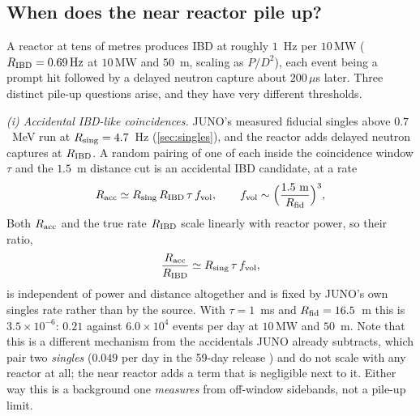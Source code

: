 \documentclass[aps,prd,superscriptaddress,nofootinbib,longbibliography,notitlepage,11pt]{revtex4-2}
\begin{document}
\subsection{When does the near reactor pile up?}
\label{sec:pileup}
A reactor at tens of metres produces IBD at roughly $1$~Hz per $10\,\mathrm{MW}$
($R_{\rm IBD}=0.69\,\mathrm{Hz}$ at $10\,\mathrm{MW}$ and $50$~m, scaling as $P/D^2$), each
event being a prompt hit followed by a delayed neutron capture about $200\,\mu$s later.
Three distinct pile-up questions arise, and they have very different thresholds.

\emph{(i) Accidental IBD-like coincidences.}  JUNO's measured fiducial singles above
$0.7$~MeV run at $R_{\rm sing}=4.7$~Hz \cite{JUNO:2026ixk} (\cref{sec:singles}), and the
reactor adds delayed neutron captures at $R_{\rm IBD}$.  A random pairing of one of each
inside the coincidence window $\tau$ and the $1.5$~m distance cut is an accidental IBD
candidate, at a rate
\begin{equation}
R_{\rm acc}\simeq R_{\rm sing}\,R_{\rm IBD}\,\tau\,f_{\rm vol},
\qquad f_{\rm vol}\sim\Big(\frac{1.5\ \mathrm{m}}{R_{\rm fid}}\Big)^{3},
\label{eq:accidental}
\end{equation}
Both $R_{\rm acc}$ and the true rate $R_{\rm IBD}$ scale linearly with reactor power, so
their ratio,
\begin{equation}
\frac{R_{\rm acc}}{R_{\rm IBD}}\simeq R_{\rm sing}\,\tau\,f_{\rm vol},
\label{eq:accratio}
\end{equation}
is independent of power and distance altogether and is fixed by JUNO's own singles rate
rather than by the source.  With $\tau=1$~ms and $R_{\rm fid}=16.5$~m this is
$3.5\times10^{-6}$: $0.21$ against $6.0\times10^4$ events per day at $10\,\mathrm{MW}$ and
$50$~m.  Note that this is a different mechanism from the accidentals JUNO already
subtracts, which pair two \emph{singles} ($0.049$ per day in the 59-day release
\cite{JUNO:2025gmd}) and do not scale with any reactor at all; the near reactor adds a
term that is negligible next to it.  Either way this is a background one \emph{measures}
from off-window sidebands, not a pile-up limit.
\end{document}
